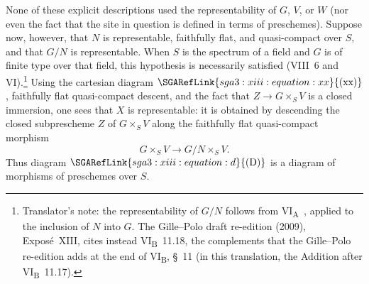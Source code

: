 None of these explicit descriptions used the representability of
\(G\), \(V\), or \(W\) (nor even the fact that the site in question is
defined in terms of preschemes). Suppose now, however, that \(N\) is
representable, faithfully flat, and quasi-compact over \(S\), and that
\(G/N\) is representable. When \(S\) is the spectrum of a field and
\(G\) is of finite type over that field, this hypothesis is necessarily
satisfied (VIII~6 and VI).\footnote{Translator's note: the
representability of \(G/N\) follows from
VI\textsubscript{A}~, applied to the inclusion
of \(N\) into \(G\). The Gille--Polo draft re-edition (2009), Exposé~XIII,
cites instead VI\textsubscript{B}~11.18, the complements that the Gille--Polo
re-edition adds at the end of VI\textsubscript{B}, \S~11 (in this
translation, the Addition after VI\textsubscript{B}~11.17).} Using the cartesian
diagram \(\SGARefLink{sga3:xiii:equation:xx}{\mathrm{(xx)}}\), faithfully flat quasi-compact descent, and
the fact that \(Z\to G\times_S V\) is a closed immersion, one sees that
\(X\) is representable: it is obtained by descending the closed
subprescheme \(Z\) of \(G\times_S V\) along the faithfully flat
quasi-compact morphism
\[
  G\times_S V\longrightarrow G/N\times_S V.
\]
Thus diagram \(\SGARefLink{sga3:xiii:equation:d}{\mathrm{(D)}}\) is a diagram of morphisms of
preschemes over \(S\).

